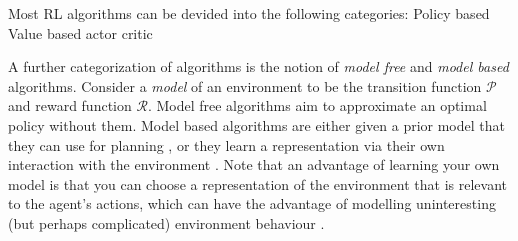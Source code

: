 \documentclass{../main.tex}{subfiles}
\begin{document}
Most RL algorithms can be devided into the following categories:
Policy based
Value based
actor critic

A further categorization of algorithms is the notion of \textit{model free} and \textit{model based} algorithms. Consider a \textit{model} of an environment to be the transition function $\mathcal{P}$ and reward function $\mathcal{R}$. Model free algorithms aim to approximate an optimal policy without them. Model based algorithms are either given a prior model that they can use for planning \citep{browne2012survey, Soemers2014}, or they learn a representation via their own interaction with the environment \citep{Sutton1991, Guzdial2017}. Note that an advantage of learning your own model is that you can choose a representation of the environment that is relevant to the agent's actions, which can have the advantage of modelling uninteresting (but perhaps complicated) environment behaviour \citep{Pathak2017}.
\end{document}
